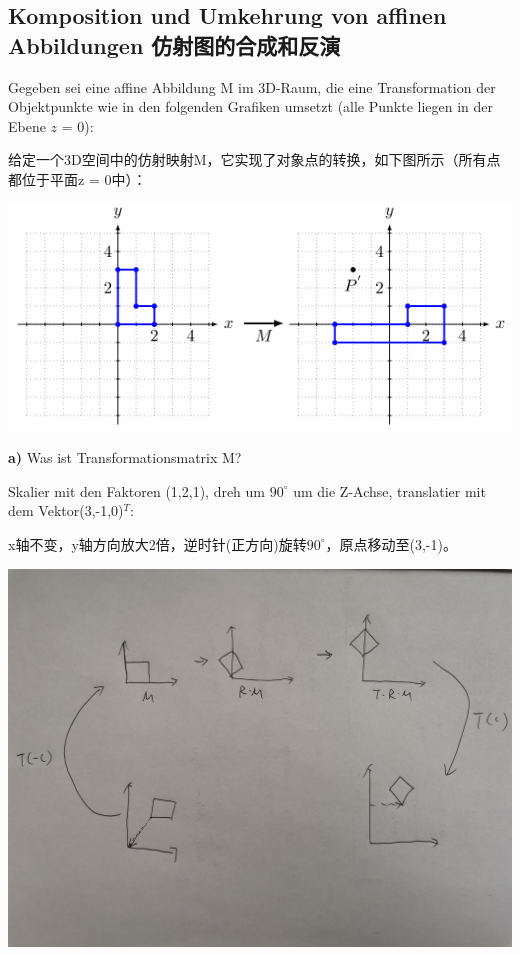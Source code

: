 \documentclass[fleqn]{article}
\begin{document}
\subsection{Komposition und Umkehrung von affinen Abbildungen 仿射图的合成和反演}

Gegeben sei eine affine Abbildung M im 3D-Raum, die eine Transformation der Objektpunkte wie in den folgenden Grafiken umsetzt (alle Punkte liegen in der Ebene $z$ = 0):

给定一个3D空间中的仿射映射M，它实现了对象点的转换，如下图所示（所有点都位于平面z = 0中）：

\begin{center}
    \includegraphics[scale=0.6]{6.png}
\end{center}

\noindent\textbf{a)}
Was ist Transformationsmatrix M?

Skalier mit den Faktoren (1,2,1), dreh um $90^{\circ}$ um die Z-Achse, translatier mit dem Vektor(3,-1,0)$^T$:  

x轴不变，y轴方向放大2倍，逆时针(正方向)旋转$90^{\circ}$，原点移动至(3,-1)。

\begin{center}
    \includegraphics[angle=90,scale=0.1]{7.png}
\end{center}
\end{document}

